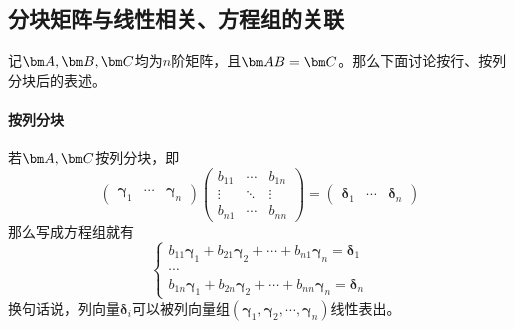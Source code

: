 \subsection{分块矩阵与线性相关、方程组的关联}
记$\mat{A},\mat{B},\mat{C}$均为$n$阶矩阵，且$\mat{AB}=\mat{C}$。那么下面讨论按行、按列分块后的表述。
\paragraph{按列分块} 若$\mat{A},\mat{C}$按列分块，即
\[
    \begin{pmatrix}
        \bm{\gamma}_1 & \cdots & \bm{\gamma}_n
    \end{pmatrix}
    \begin{pmatrix}
        b_{11} & \cdots & b_{1n} \\
        \vdots & \ddots & \vdots \\
        b_{n1} & \cdots & b_{nn}
    \end{pmatrix}
    =
    \begin{pmatrix}
        \bm{\delta}_1 & \cdots & \bm{\delta}_n
    \end{pmatrix}
\]
那么写成方程组就有
\[
    \begin{cases}
        b_{11}\bm{\gamma}_1 + b_{21}\bm{\gamma}_2 + \cdots + b_{n1}\bm{\gamma}_n = \bm{\delta}_1 \\
        \cdots                                                                                   \\
        b_{1n}\bm{\gamma}_1 + b_{2n}\bm{\gamma}_2 + \cdots + b_{nn}\bm{\gamma}_n = \bm{\delta}_n
    \end{cases}
\]
换句话说，列向量$\bm{\delta}_i$可以被列向量组$(\bm{\gamma}_1,\bm{\gamma}_2,\cdots,\bm{\gamma}_n)$线性表出。

